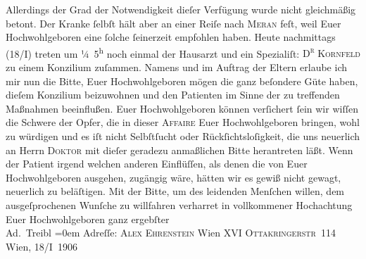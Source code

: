 {\begin{ledgroupsized}[t]{13cm}
               Allerdings  der Grad der Notwendigkeit dieſer
               Verfügung wurde nicht gleichmäßig betont. Der Kranke ſelbſt hält aber an einer Reiſe
               nach \textsc{Meran} feſt, weil Euer Hochwohlgeboren eine ſolche ſeinerzeit empfohlen haben.\pend
           \pstart
           Heute{ }nachmittags (18/I) treten um ¼ 5\textsuperscript{h} noch einmal der Hausarzt und ein Spezialiſt: \textsc{D\textsuperscript{r}{ }Kornfeld} zu einem Konzilium zuſammen. Namens und im Auftrag der Eltern erlaube ich mir nun die Bitte, Euer
               Hochwohlgeboren mögen die ganz beſondere Güte haben, {\pb}dieſem Konzilium beizuwohnen und den Patienten im Sinne der zu treffenden Maßnahmen
               beeinflußen.\pend
           \pstart
           Euer Hochwohlgeboren können verſichert ſein wir wiſſen die Schwere der Opfer, die in
               dieser \textsc{Affaire} Euer Hochwohlgeboren bringen, wohl zu
               würdigen und es iſt nicht Selbſtſucht oder Rückſichtsloſigkeit, die uns neuerlich an
               Herrn \textsc{Doktor} mit dieſer geradezu anmaßlichen Bitte
               herantreten läßt. Wenn der Patient irgend welchen anderen Einflüſſen, als denen die von Euer
               Hochwohlgeboren ausgehen, zugängig wäre, hätten wir es gewiß nicht {\pb}gewagt, neuerlich zu beläſtigen.\pend
           \pstart
           Mit der Bitte, um des leidenden Menſchen willen, dem ausgeſprochenen Wunſche zu willfahren verharret in
               vollkommener Hochachtung\pend
           \pstart
           Euer Hochwohlgeboren ganz ergebſter{\\[\baselineskip]}\spacefill\mbox{Ad. Treibl}\pend
           \leftskip=0em{}\pstart
           \noindent{}Adreſſe: \textsc{Alex Ehrenstein}\pend
           \pstart
           Wien XVI\pend
           \pstart
           \textsc{Ottakringerstr} 114\pend
           \pstart
           Wien, 18/I 1906\pend
           

\end{ledgroupsized}}
